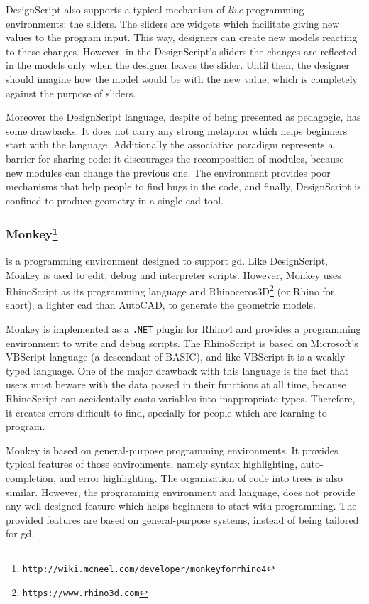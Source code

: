 DesignScript also supports a typical mechanism of \textit{live} programming environments: the sliders. The sliders are widgets which facilitate giving new values to the program input. This way, designers can create new models reacting to these changes. However, in the DesignScript's sliders the changes are reflected in the models only when the designer leaves the slider. Until then, the designer should imagine how the model would be with the new value, which is completely against the purpose of sliders.

Moreover the DesignScript language, despite of being presented as pedagogic, has some drawbacks. It does not carry any strong metaphor which helps beginners start with the language. Additionally the associative paradigm represents a barrier for sharing code: it discourages the recomposition of modules, because new modules can change the previous one. The environment provides poor mechanisms that help people to find bugs in the code, and finally,  DesignScript is confined to produce geometry in a single \ac{cad} tool.
\subsubsection{Monkey\protect\footnote{\texttt{http://wiki.mcneel.com/developer/monkeyforrhino4}}} is a programming environment designed to support \ac{gd}. Like DesignScript, Monkey is used to edit, debug and interpreter scripts. However, Monkey uses RhinoScript as its programming language and Rhinoceros3D\footnote{\label{rhin}\texttt{https://www.rhino3d.com}} (or Rhino for short), a lighter \ac{cad} than AutoCAD, to generate the geometric models.

Monkey is implemented as a \texttt{.NET} plugin for Rhino4 and provides a programming environment to write and debug scripts. The RhinoScript is based on Microsoft's VBScript language (a descendant of BASIC), and like VBScript it is a weakly typed language. One of the major drawback with this language is the fact that users must beware with the data passed in their functions at all time, because RhinoScript can accidentally casts variables into inappropriate types. Therefore, it creates errors difficult to find, specially for people which are learning to program.

Monkey is based on general-purpose programming environments. It provides typical features of those environments, namely syntax highlighting, auto-completion, and error highlighting. The organization of code into trees is also similar. However, the programming environment and language, does not provide any well designed feature which helps beginners to start with programming. The provided features are based on general-purpose systems, instead of being tailored for \ac{gd}.
